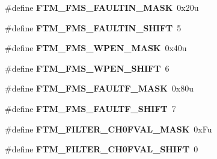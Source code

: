 \begin{DoxyCompactItemize}
\item 
\hypertarget{group___f_t_m___register___masks_ga8dc6b10cac09f19a505e0e1f6348e2ff}{}\#define {\bfseries F\+T\+M\+\_\+\+F\+M\+S\+\_\+\+F\+A\+U\+L\+T\+I\+N\+\_\+\+M\+A\+S\+K}~0x20u\label{group___f_t_m___register___masks_ga8dc6b10cac09f19a505e0e1f6348e2ff}

\item 
\hypertarget{group___f_t_m___register___masks_ga7a46a22f36d059f68a8ac08aca8df377}{}\#define {\bfseries F\+T\+M\+\_\+\+F\+M\+S\+\_\+\+F\+A\+U\+L\+T\+I\+N\+\_\+\+S\+H\+I\+F\+T}~5\label{group___f_t_m___register___masks_ga7a46a22f36d059f68a8ac08aca8df377}

\item 
\hypertarget{group___f_t_m___register___masks_gada77d4d54efd09f61e02636d5e234f94}{}\#define {\bfseries F\+T\+M\+\_\+\+F\+M\+S\+\_\+\+W\+P\+E\+N\+\_\+\+M\+A\+S\+K}~0x40u\label{group___f_t_m___register___masks_gada77d4d54efd09f61e02636d5e234f94}

\item 
\hypertarget{group___f_t_m___register___masks_gad0b6b97c900f82f6127d5acd85b8f965}{}\#define {\bfseries F\+T\+M\+\_\+\+F\+M\+S\+\_\+\+W\+P\+E\+N\+\_\+\+S\+H\+I\+F\+T}~6\label{group___f_t_m___register___masks_gad0b6b97c900f82f6127d5acd85b8f965}

\item 
\hypertarget{group___f_t_m___register___masks_ga93fbf9b3017167d24d1f0c067bccb539}{}\#define {\bfseries F\+T\+M\+\_\+\+F\+M\+S\+\_\+\+F\+A\+U\+L\+T\+F\+\_\+\+M\+A\+S\+K}~0x80u\label{group___f_t_m___register___masks_ga93fbf9b3017167d24d1f0c067bccb539}

\item 
\hypertarget{group___f_t_m___register___masks_ga05ba4258421f814e99f498159df781d7}{}\#define {\bfseries F\+T\+M\+\_\+\+F\+M\+S\+\_\+\+F\+A\+U\+L\+T\+F\+\_\+\+S\+H\+I\+F\+T}~7\label{group___f_t_m___register___masks_ga05ba4258421f814e99f498159df781d7}

\item 
\hypertarget{group___f_t_m___register___masks_ga021b2ed3cc7b79cda874ff49fbd0dd5a}{}\#define {\bfseries F\+T\+M\+\_\+\+F\+I\+L\+T\+E\+R\+\_\+\+C\+H0\+F\+V\+A\+L\+\_\+\+M\+A\+S\+K}~0x\+Fu\label{group___f_t_m___register___masks_ga021b2ed3cc7b79cda874ff49fbd0dd5a}

\item 
\hypertarget{group___f_t_m___register___masks_ga35f6890f59003ec058dbcc151ebc399c}{}\#define {\bfseries F\+T\+M\+\_\+\+F\+I\+L\+T\+E\+R\+\_\+\+C\+H0\+F\+V\+A\+L\+\_\+\+S\+H\+I\+F\+T}~0\label{group___f_t_m___register___masks_ga35f6890f59003ec058dbcc151ebc399c}


\end{DoxyCompactItemize}
